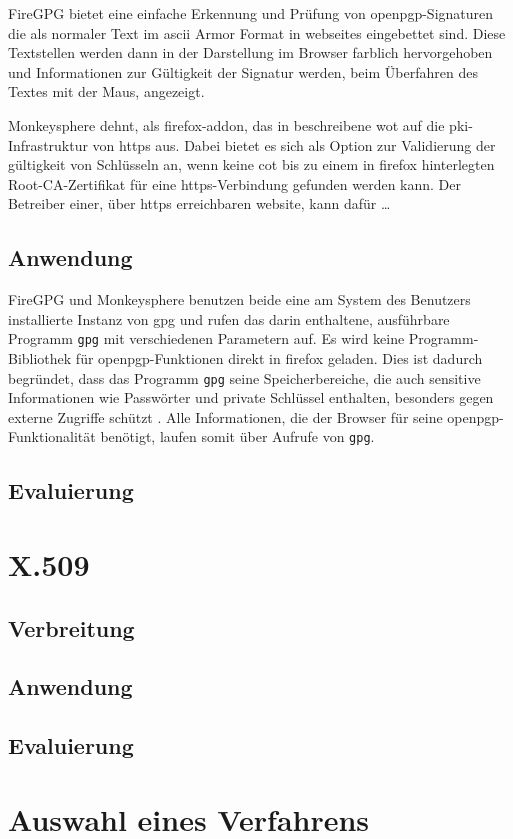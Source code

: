 FireGPG bietet eine einfache Erkennung und Prüfung von \gls{openpgp}-Signaturen die als normaler Text im \gls{ascii} Armor Format \cite{openpgp:ietf} in
\glspl{webseite} eingebettet sind. Diese Textstellen werden dann in der Darstellung im Browser farblich hervorgehoben und Informationen zur Gültigkeit der
Signatur werden, beim Überfahren des Textes mit der Maus, angezeigt.

Monkeysphere dehnt, als \gls{firefox-addon}, das in  beschreibene \gls{wot} auf die \gls{pki}-Infrastruktur von
\gls{https} aus. Dabei bietet es sich als Option zur Validierung der gültigkeit von Schlüsseln an, wenn keine \gls{cot} bis zu einem in \gls{firefox}
hinterlegten Root-CA-Zertifikat für eine \gls{https}-Verbindung gefunden werden kann. Der Betreiber einer, über \gls{https} erreichbaren \gls{website}, kann
dafür \ldots \todo

\subsection{Anwendung}
FireGPG und Monkeysphere benutzen beide eine am System des Benutzers installierte Instanz von \gls{gpg} und rufen das darin enthaltene, ausführbare Programm
\texttt{gpg} mit verschiedenen Parametern auf. Es wird keine Programm-Bibliothek für \gls{openpgp}-Funktionen direkt in \gls{firefox} geladen. Dies ist dadurch
begründet, dass das Programm \texttt{gpg} seine Speicherbereiche, die auch sensitive Informationen wie Passwörter und private Schlüssel enthalten, besonders
gegen externe Zugriffe schützt \cite{pgp}. Alle Informationen, die der Browser für seine \gls{openpgp}-Funktionalität benötigt, laufen somit über Aufrufe von
\texttt{gpg}.


\subsection{Evaluierung}

\section{X.509}
\label{sec:Signaturverfahren:x509}

\subsection{Verbreitung}

\subsection{Anwendung}

\subsection{Evaluierung}

\section{Auswahl eines Verfahrens}


